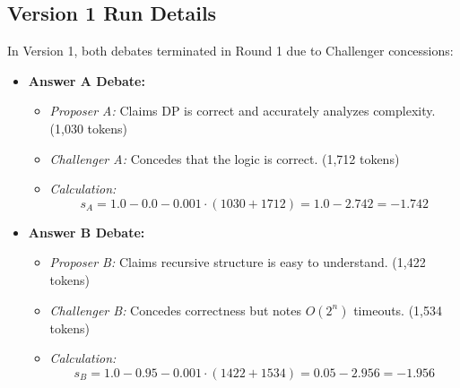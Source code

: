\documentclass[11pt]{article}
\begin{document}
\subsection{Version 1 Run Details}
In Version 1, both debates terminated in Round 1 due to Challenger concessions:
\begin{itemize}
    \item \textbf{Answer A Debate:}
    \begin{itemize}
        \item \textit{Proposer A:} Claims DP is correct and accurately analyzes complexity. (1,030 tokens)
        \item \textit{Challenger A:} Concedes that the logic is correct. (1,712 tokens)
        \item \textit{Calculation:} 
        \[ s_A = 1.0 - 0.0 - 0.001 \cdot (1030 + 1712) = 1.0 - 2.742 = -1.742 \]
    \end{itemize}
    \item \textbf{Answer B Debate:}
    \begin{itemize}
        \item \textit{Proposer B:} Claims recursive structure is easy to understand. (1,422 tokens)
        \item \textit{Challenger B:} Concedes correctness but notes $O(2^n)$ timeouts. (1,534 tokens)
        \item \textit{Calculation:} 
        \[ s_B = 1.0 - 0.95 - 0.001 \cdot (1422 + 1534) = 0.05 - 2.956 = -1.956 \]
    \end{itemize}
\end{itemize}
\end{document}
